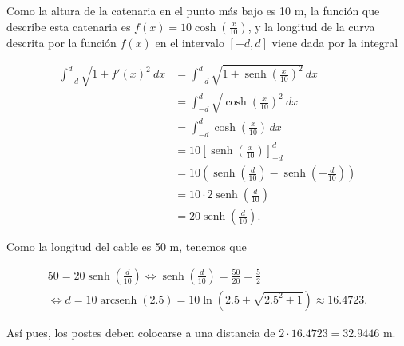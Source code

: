\documentclass[
  spanish,
  a4paper,
]{scrreport}
\theoremstyle{definition}
\theoremstyle{remark}
\begin{document}
\begin{tcolorbox}[enhanced jigsaw, arc=.35mm, bottomrule=.15mm, bottomtitle=1mm, breakable, colback=white, colbacktitle=quarto-callout-tip-color!10!white, colframe=quarto-callout-tip-color-frame, coltitle=black, left=2mm, leftrule=.75mm, opacityback=0, opacitybacktitle=0.6, rightrule=.15mm, title=\textcolor{quarto-callout-tip-color}{\faLightbulb}\hspace{0.5em}{Solución}, titlerule=0mm, toprule=.15mm, toptitle=1mm]

Como la altura de la catenaria en el punto más bajo es 10 m, la función
que describe esta catenaria es
\(f(x) = 10 \cosh \left( \frac{x}{10} \right)\), y la longitud de la
curva descrita por la función \(f(x)\) en el intervalo \([-d, d]\) viene
dada por la integral

\begin{align*}
\int_{-d}^{d} \sqrt{1 + f'(x)^2} \, dx
&= \int_{-d}^{d} \sqrt{1 + \operatorname{senh} \left( \frac{x}{10}\right)^2} \, dx \\
&= \int_{-d}^{d} \sqrt{\cosh \left( \frac{x}{10}\right)^2} \, dx \\
&= \int_{-d}^{d} \cosh \left( \frac{x}{10}\right) \, dx \\
&= 10 \left[ \operatorname{senh} \left( \frac{x}{10}\right) \right]_{-d}^{d} \\
&= 10 \left( \operatorname{senh} \left( \frac{d}{10}\right) - \operatorname{senh} \left( -\frac{d}{10}\right) \right) \\
&= 10\cdot 2 \operatorname{senh} \left( \frac{d}{10}\right)\\
&= 20 \operatorname{senh} \left( \frac{d}{10}\right).
\end{align*}

Como la longitud del cable es 50 m, tenemos que

\[
\begin{gathered}
50 = 20 \operatorname{senh} \left( \frac{d}{10}\right) 
\Leftrightarrow \operatorname{senh} \left(\frac{d}{10}\right) = \frac{50}{20} = \frac{5}{2} \\
\Leftrightarrow d = 10\operatorname{arcsenh}(2.5) = 10 \ln \left(2.5 + \sqrt{2.5^2 + 1}\right) \approx 16.4723.
\end{gathered}
\]

Así pues, los postes deben colocarse a una distancia de
\(2 \cdot 16.4723 = 32.9446\) m.

\end{tcolorbox}
\end{document}
